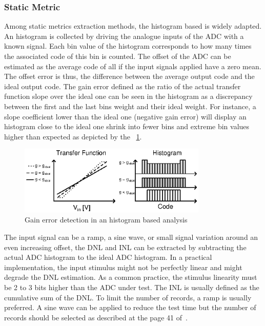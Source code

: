     \subsubsection{Static Metric}
Among static metrics extraction methods, the histogram based is widely adapted. An histogram is collected by driving the analogue inputs of the ADC with a known signal. Each bin value of the histogram corresponds to how many times the associated code of this bin is counted. The offset of the ADC can be estimated as the average code of all if the input signals applied have a zero mean. The offset error is thus, the difference between the average output code and the ideal output code. The gain error defined as the ratio of the actual transfer function slope over the ideal one can be seen in the histogram as a discrepancy between the first and the last bins weight and their ideal weight. For instance, a slope coefficient lower than the ideal one (negative gain error) will display an histogram close to the ideal one shrink into fewer bins and extreme bin values higher than expected as depicted by the \figurename~\ref{fig:gain-error-hist}.

\begin{figure}[htp]
    \centering
    \includegraphics[width=0.8\textwidth]{Chapter5/Figs/sar_test/histogram_gain_error.ps}
    \caption{Gain error detection in an histogram based analysis}
    \label{fig:gain-error-hist}
\end{figure}

The input signal can be a ramp, a sine wave, or small signal variation around an even increasing offset, the DNL and INL can be extracted by subtracting the actual ADC histogram to the ideal ADC histogram. In a practical implementation, the input stimulus might not be perfectly linear and might degrade the DNL estimation. As a common practice, the stimulus linearity must be 2 to 3 bits higher than the ADC under test. The INL is usually defined as the cumulative sum of the DNL\@. To limit the number of records, a ramp is usually preferred. A sine wave can be applied to reduce the test time but the number of records should be selected as described at the page 41 of~\cite{IEEESTD1241-2010}.

